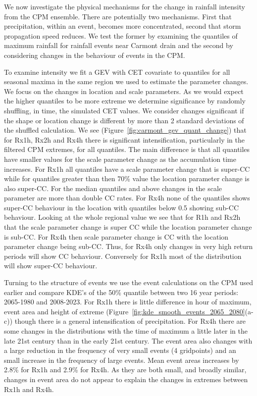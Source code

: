 \documentclass[11pt,a4paper]{article}
\begin{document}
We now investigate the physical mechanisms for the change in rainfall intensity from the CPM ensemble. There are potentially two mechanisms. First that precipitation, within an event, becomes more concentrated, second that storm propagation speed reduces. We test the former by examining  the quantiles of maximum rainfall for  rainfall events near Carmont drain and the second by  considering changes in the behaviour of events in the CPM. 

To examine intensity we fit a GEV with CET covariate to quantiles for all seasonal maxima in the same region we used to estimate the parameter changes. We focus on the changes in location and scale parameters. As we would expect the higher quantiles to be more extreme we determine significance by randomly shuffling, in time, the simulated CET values. We consider  changes significant if the shape or location change is different by more than 2 standard deviations of the shuffled calculation. We see (Figure~\ref{fig:carmont_gev_quant_change}) that for Rx1h, Rx2h and Rx4h there is significant intensification, particularly in the filtered CPM extremes, for all quantiles.  The main difference is that all quantiles have smaller values for the scale parameter change as the accumulation time increases.  For Rx1h all quantiles have a scale parameter change that is super-CC while for quantiles greater than then 70\% value the location parameter change is also super-CC. For the median quantiles and above changes in the scale parameter are more than double CC rates.  For Rx4h none of the quantiles shows super-CC behaviour in the location with quantiles below 0.5 showing sub-CC behaviour.  Looking at the whole regional value we see that for R1h and Rx2h that the scale parameter change is  super CC while the location parameter change is sub-CC. For Rx4h then scale parameter change is CC with the location parameter change being sub-CC. Thus, for Rx4h only changes in very high return periods will show CC behaviour. Conversely for Rx1h most of the distribution will show super-CC behaviour. 

 Turning to the structure of events we use the event calculations on the CPM used earlier and compare KDE's of the 50\% quantile between two 16 year periods: 2065-1980 and 2008-2023. For Rx1h  there is little difference in hour of maximum, event area and height of extreme (Figure~\ref{fig:kde_smooth_events_2065_2080}(a-c)) though there is a general intensification of precipitation.  For Rx4h there are some changes in the distributions with the time of maximum a little later in the late 21st century than in the early 21st century.  The  event area also changes with a large reduction in the frequency of very small  events (4 gridpoints) and an small increase in the frequency of large events. Mean event areas increases by 2.8\% for Rx1h and 2.9\% for Rx4h. As they are both small, and broadly similar, changes in event area do not appear to explain the changes in extremes between Rx1h and Rx4h. 
 
\end{document}
